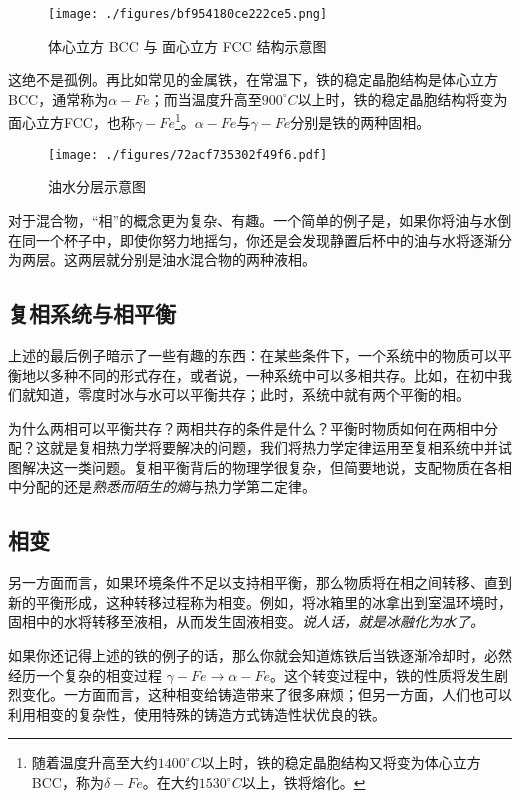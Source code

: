 \begin{figure}[ht]
\centering
\texttt{[image: ./figures/bf954180ce222ce5.png]}
\caption{体心立方 BCC 与 面心立方 FCC 结构示意图} \label{fig_PHS_4}
\end{figure}
这绝不是孤例。再比如常见的金属铁，在常温下，铁的稳定晶胞结构是体心立方BCC，通常称为$\alpha-Fe$；而当温度升高至$900 ^\circ C$以上时，铁的稳定晶胞结构将变为面心立方FCC，也称$\gamma-Fe$\footnote{随着温度升高至大约$1400 ^\circ C$以上时，铁的稳定晶胞结构又将变为体心立方BCC，称为$\delta - Fe$。在大约$1530 ^\circ C$以上，铁将熔化。}。$\alpha-Fe$与$\gamma-Fe$分别是铁的两种固相。

\begin{figure}[ht]
\centering
\texttt{[image: ./figures/72acf735302f49f6.pdf]}
\caption{油水分层示意图} \label{fig_PHS_5}
\end{figure}
对于混合物，“相”的概念更为复杂、有趣。一个简单的例子是，如果你将油与水倒在同一个杯子中，即使你努力地摇匀，你还是会发现静置后杯中的油与水将逐渐分为两层。这两层就分别是油水混合物的两种液相。


\subsection{复相系统与相平衡}
上述的最后例子暗示了一些有趣的东西：在某些条件下，一个系统中的物质可以平衡地以多种不同的形式存在，或者说，一种系统中可以多相共存。比如，在初中我们就知道，零度时冰与水可以平衡共存；此时，系统中就有两个平衡的相。


为什么两相可以平衡共存？两相共存的条件是什么？平衡时物质如何在两相中分配？这就是复相热力学将要解决的问题，我们将热力学定律运用至复相系统中并试图解决这一类问题。复相平衡背后的物理学很复杂，但简要地说，支配物质在各相中分配的还是\textsl{熟悉而陌生的熵}与热力学第二定律。

\subsection{相变}
另一方面而言，如果环境条件不足以支持相平衡，那么物质将在相之间转移、直到新的平衡形成，这种转移过程称为相变。例如，将冰箱里的冰拿出到室温环境时，固相中的水将转移至液相，从而发生固液相变。\textsl{说人话，就是冰融化为水了。}

如果你还记得上述的铁的例子的话，那么你就会知道炼铁后当铁逐渐冷却时，必然经历一个复杂的相变过程 $\gamma - Fe \rightarrow \alpha - Fe$。这个转变过程中，铁的性质将发生剧烈变化。一方面而言，这种相变给铸造带来了很多麻烦；但另一方面，人们也可以利用相变的复杂性，使用特殊的铸造方式铸造性状优良的铁。
